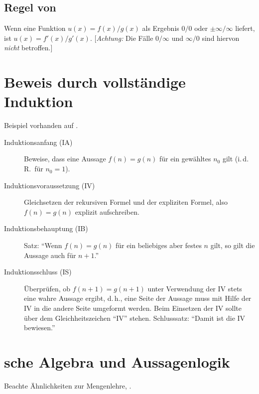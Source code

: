 \section{Regel von }
Wenn eine Funktion $u(x)=f(x)/g(x)$ als Ergebnis $0/0$ oder $\pm \infty/\infty$ liefert, ist $u(x)=f'(x)/g'(x)$.
[\emph{Achtung:} Die Fälle $0/\infty$ und $\infty/0$ sind hiervon \emph{nicht} betroffen.]



\chapter[Vollständige Induktion]{Beweis durch vollständige Induktion}

\CheckedBox{} Beispiel vorhanden auf .
\begin{description}
  \item [Induktionsanfang (IA)] 
	Beweise, dass eine Aussage $f(n)=g(n)$ für ein ge\-wählt\-es $n_{0}$ gilt (i.\,d.\,R.~für $n_{0}=1$).
  \item [Induktionsvoraussetzung (IV)]
	Gleichsetzen der rekursiven Formel und der expliziten Formel, also $f(n)=g(n)$ explizit aufschreiben.
  \item [Induktionsbehauptung (IB)]
	Satz: \enquote{Wenn $f(n)=g(n)$ für ein beliebiges aber festes $n$ gilt, so gilt die Aussage auch für $n+1$.}
  \item [Induktionsschluss (IS)]
	Überprüfen, ob $f(n+1)=g(n+1)$ unter Verwendung der IV stets eine wahre Aussage ergibt, d.\,h., eine Seite der Aussage muss mit Hilfe der IV in die andere Seite umgeformt werden.
	Beim Einsetzen der IV sollte über dem Gleichheitszeichen \enquote{IV} stehen.
	Schlusssatz: \enquote{Damit ist die IV bewiesen.}
\end{description}


\chapter{sche Algebra und Aussagenlogik}

Beachte Ähnlichkeiten zur Mengenlehre, .

